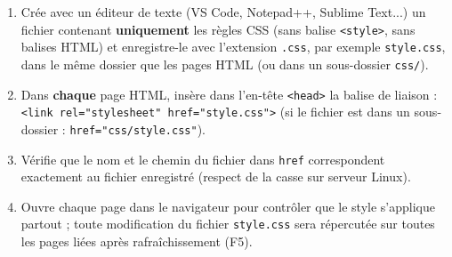 \documentclass[11pt]{article}
\begin{document}
\begin{methode}
\begin{enumerate}
  \item Crée avec un éditeur de texte (VS Code, Notepad++, Sublime Text...) un fichier contenant \textbf{uniquement} les règles CSS (sans balise \texttt{<style>}, sans balises HTML) et enregistre-le avec l'extension \texttt{.css}, par exemple \texttt{style.css}, dans le même dossier que les pages HTML (ou dans un sous-dossier \texttt{css/}).
  \item Dans \textbf{chaque} page HTML, insère dans l'en-tête \texttt{<head>} la balise de liaison :
  \texttt{<link rel="stylesheet" href="style.css">}
  (si le fichier est dans un sous-dossier : \texttt{href="css/style.css"}).
  \item Vérifie que le nom et le chemin du fichier dans \texttt{href} correspondent exactement au fichier enregistré (respect de la casse sur serveur Linux).
  \item Ouvre chaque page dans le navigateur pour contrôler que le style s'applique partout ; toute modification du fichier \texttt{style.css} sera répercutée sur toutes les pages liées après rafraîchissement (F5).
\end{enumerate}
\end{methode}
\end{document}

